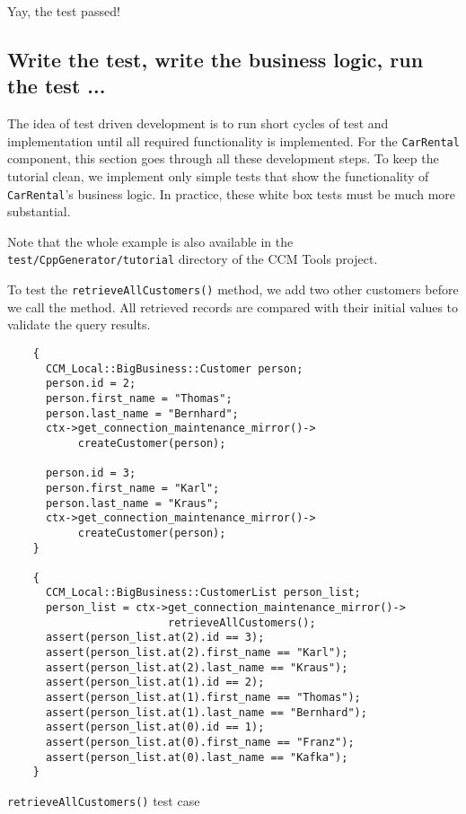 Yay, the test passed!



\subsection{Write the test, write the business logic, run the test ...}
The idea of test driven development is to run short cycles of test and
implementation until all required functionality is implemented.
For the {\tt CarRental} component, this section goes through all these 
development steps. 
To keep the tutorial clean, we implement only simple tests that show the
functionality of {\tt CarRental}'s business logic.
In practice, these white box tests must be much more substantial.

Note that the whole example is also available in the {\tt test/CppGenerator/tutorial}
directory of the CCM Tools project. 

\newpage
To test the {\tt retrieveAllCustomers()} method, we add two other customers before
we call the method. All retrieved records are compared with their initial values
to validate the query results. 

\begin{Example}
\begin{minifbox}
\begin{small}
\begin{verbatim}
    {
      CCM_Local::BigBusiness::Customer person;
      person.id = 2;
      person.first_name = "Thomas";
      person.last_name = "Bernhard";
      ctx->get_connection_maintenance_mirror()->
           createCustomer(person);

      person.id = 3;
      person.first_name = "Karl";
      person.last_name = "Kraus";
      ctx->get_connection_maintenance_mirror()->
           createCustomer(person);
    }

    {
      CCM_Local::BigBusiness::CustomerList person_list;
      person_list = ctx->get_connection_maintenance_mirror()->
                         retrieveAllCustomers();
      assert(person_list.at(2).id == 3);
      assert(person_list.at(2).first_name == "Karl");
      assert(person_list.at(2).last_name == "Kraus");
      assert(person_list.at(1).id == 2);
      assert(person_list.at(1).first_name == "Thomas");
      assert(person_list.at(1).last_name == "Bernhard");
      assert(person_list.at(0).id == 1);
      assert(person_list.at(0).first_name == "Franz");
      assert(person_list.at(0).last_name == "Kafka");
    }      
\end{verbatim}
\end{small}
\end{minifbox}
\caption{{\tt retrieveAllCustomers()} test case}
\label{example:retrieveAllCustomersTest}
\end{Example}


